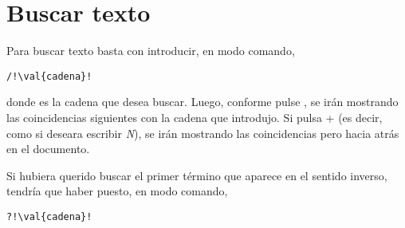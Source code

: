 \section{Buscar texto}\label{sec:vim-buscar}
Para buscar texto basta con introducir, en modo comando,

\begin{lstlisting}[gobble=2,style=bashinteract,escapechar=!]
  /!\val{cadena}!
\end{lstlisting}

\noindent donde  es la cadena que desea buscar. Luego, conforme pulse , se irán
mostrando las coincidencias siguientes con la cadena que introdujo. Si pulsa \tecla{\(\Uparrow\)} + 
(es decir, como si deseara escribir \emph{N}), se irán mostrando las coincidencias pero hacia atrás en el
documento.

Si hubiera querido buscar el primer término que aparece en el sentido inverso, tendría que haber puesto, en modo
comando,

\begin{lstlisting}[gobble=2,style=bashinteract,escapechar=!]
  ?!\val{cadena}!
\end{lstlisting}
